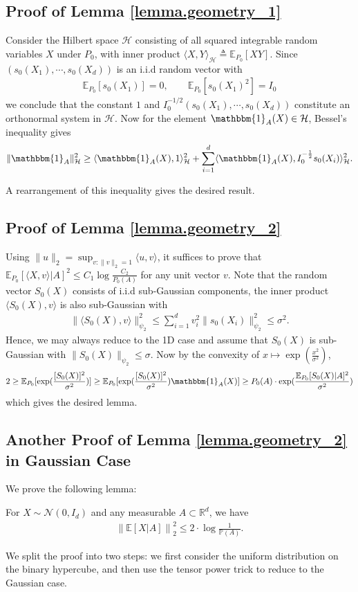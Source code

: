 \documentclass[final,12pt]{colt2018} %
\def \bP {\mathbb{P}}
\def \bE {\mathbb{E}}
\def \bR {\mathbb{R}}
\newcommand{\jiao}[1]{\langle{#1}\rangle}
\newcommand{\calH}{{\mathcal{H}}}
\newcommand{\calN}{{\mathcal{N}}}
\begin{document}
\subsection{Proof of Lemma \ref{lemma.geometry_1}}
Consider the Hilbert space $\calH$ consisting of all squared integrable random variables $X$ under $P_0$, with inner product $\langle X,Y\rangle_{\calH}\triangleq \bE_{P_0}[XY]$. Since $(s_{0}(X_1),\cdots,s_{0}(X_d))$ is an i.i.d random vector with
\begin{align*}
\bE_{P_0}[s_{0}(X_1)] = 0,\qquad \bE_{P_0}[s_{0}(X_1)^2]=I_0
\end{align*}
we conclude that the constant $1$ and $I_0^{-1/2}(s_{0}(X_1),\cdots,s_{0}(X_d))$ constitute an orthonormal system in $\calH$. Now for the element $\mathbbm{1}_A(X)\in\calH$, Bessel's inequality \cite{rudin1987real} gives
\begin{align*}
\|\mathbbm{1}_A\|_{\calH}^2 \ge \jiao{\mathbbm{1}_A(X), 1}_\calH^2+ \sum_{i=1}^d \langle \mathbbm{1}_A(X), I_0^{-\frac{1}{2}}s_{0}(X_i)\rangle_{\calH}^2.
\end{align*}

A rearrangement of this inequality gives the desired result. 

\subsection{Proof of Lemma \ref{lemma.geometry_2}}
Using $\|u\|_2=\sup_{v:\|v\|_2=1}\langle u,v\rangle$, it suffices to prove that $\bE_{P_0}[\langle X,v\rangle|A]^2\le C_1\log\frac{C_2}{P_0(A)}$ for any unit vector $v$. Note that the random vector $S_0(X)$ consists of i.i.d sub-Gaussian components, the inner product $\langle S_0(X),v\rangle$ is also sub-Gaussian with
\begin{align*}
\|\langle S_0(X),v\rangle \|_{\psi_2}^2 \le \sum_{i=1}^d v_i^2\|s_0(X_i)\|_{\psi_2}^2 \le \sigma^2.
\end{align*}
Hence, we may always reduce to the 1D case and assume that $S_0(X)$ is sub-Gaussian with $\|S_0(X)\|_{\psi_2}\le \sigma$. Now by the convexity of $x\mapsto \exp(\frac{x^2}{\sigma^2})$, 
\begin{align*}
2 \ge \bE_{P_0}[\exp(\frac{[S_0(X)]^2}{\sigma^2})] \ge \bE_{P_0}[\exp(\frac{[S_0(X)]^2}{\sigma^2})\mathbbm{1}_A(X)] \ge P_0(A)\cdot \exp(\frac{\bE_{P_0}[S_0(X)|A]^2}{\sigma^2})
\end{align*}
which gives the desired lemma. 

\subsection{Another Proof of Lemma \ref{lemma.geometry_2} in Gaussian Case}
We prove the following lemma:
\begin{lemma}\label{lemma.geometry_gaussian}
	For $X\sim \calN(0,I_d)$ and any measurable $A\subset \bR^d$, we have
	\begin{align*}
	\left\|\bE[X|A]\right\|_2^2 \le 2\cdot \log \frac{1}{\bP(A)}.
	\end{align*}
\end{lemma}
We split the proof into two steps: we first consider the uniform distribution on the binary hypercube, and then use the tensor power trick to reduce to the Gaussian case.
\end{document}
